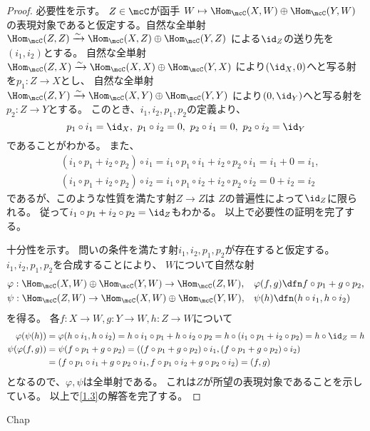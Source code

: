 \documentclass[uplatex,dvipdfmx]{jsarticle}
\begin{document}
\begin{proof}
  必要性を示す。
  \(Z\in \mcC\)が函手
  \(W\mapsto \Hom_{\mcC}(X,W)\oplus \Hom_{\mcC}(Y,W)\)
  の表現対象であると仮定する。自然な全単射
  \(\Hom_{\mcC}(Z,Z) \xrightarrow{\sim} \Hom_{\mcC}(X,Z)\oplus \Hom_{\mcC}(Y,Z)\)
  による\(\id_Z\)の送り先を\((i_1,i_2)\)とする。
  自然な全単射
  \(\Hom_{\mcC}(Z,X) \xrightarrow{\sim} \Hom_{\mcC}(X,X)\oplus \Hom_{\mcC}(Y,X)\)
  により\((\id_X,0)\)へと写る射を\(p_1:Z\to X\)とし、
  自然な全単射
  \(\Hom_{\mcC}(Z,Y) \xrightarrow{\sim} \Hom_{\mcC}(X,Y)\oplus \Hom_{\mcC}(Y,Y)\)
  により\((0,\id_Y)\)へと写る射を\(p_2:Z\to Y\)とする。
  このとき、\(i_1,i_2,p_1,p_2\)の定義より、
  \[
  p_1\circ i_1 = \id_X, \ p_1\circ i_2 = 0, \
  p_2\circ i_1 = 0, \ p_2\circ i_2 = \id_Y
  \]
  であることがわかる。
  また、
  \begin{align*}
    &(i_1\circ p_1 + i_2\circ p_2) \circ i_1
    = i_1\circ p_1 \circ i_1 + i_2\circ p_2 \circ i_1
    = i_1 + 0 = i_1, \\
    &(i_1\circ p_1 + i_2\circ p_2) \circ i_2
    = i_1\circ p_1 \circ i_2 + i_2\circ p_2 \circ i_2
    = 0 + i_2 = i_2
  \end{align*}
  であるが、このような性質を満たす射\(Z\to Z\)は
  \(Z\)の普遍性によって\(\id_Z\)に限られる。
  従って\(i_1\circ p_1 + i_2\circ p_2 = \id_Z\)もわかる。
  以上で必要性の証明を完了する。

  十分性を示す。
  問いの条件を満たす射\(i_1,i_2,p_1,p_2\)が存在すると仮定する。
  \(i_1,i_2,p_1,p_2\)を合成することにより、
  \(W\)について自然な射
  \begin{align*}
    &\varphi: \Hom_{\mcC}(X,W) \oplus \Hom_{\mcC}(Y,W) \to \Hom_{\mcC}(Z,W),
    &&\varphi(f,g) \dfn f\circ p_1 + g\circ p_2, \\
    &\psi: \Hom_{\mcC}(Z,W) \to \Hom_{\mcC}(X,W) \oplus \Hom_{\mcC}(Y,W),
    &&\psi(h) \dfn (h\circ i_1, h\circ i_2) \\
  \end{align*}
  を得る。
  各\(f:X\to W, g:Y\to W, h:Z\to W\)について
  \begin{align*}
    \varphi(\psi(h)) &= \varphi(h\circ i_1, h\circ i_2)
    = h\circ i_1 \circ p_1 + h\circ i_2\circ p_2
    = h\circ (i_1 \circ p_1 + i_2 \circ p_2) = h\circ \id_Z = h \\
    \psi(\varphi(f,g)) &= \psi(f\circ p_1 + g\circ p_2)
    = ((f\circ p_1 + g\circ p_2)\circ i_1, (f\circ p_1 + g\circ p_2)\circ i_2) \\
    &= (f\circ p_1\circ i_1 + g\circ p_2\circ i_1,
    f\circ p_1\circ i_2 + g\circ p_2 \circ i_2)
    = (f,g)
  \end{align*}
  となるので、\(\varphi,\psi\)は全単射である。
  これは\(Z\)が所望の表現対象であることを示している。
  以上で\autoref{1.3}の解答を完了する。
\end{proof}



\ifcsname Chap\endcsname\else
\printbibliography
\end{document}
